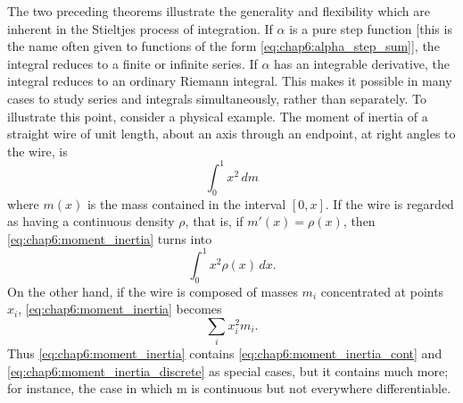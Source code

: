 \begin{remark} %
  \label{rem:chap6:stieltjes_generality}
  The two preceding theorems illustrate the generality and
  flexibility which are inherent in the Stieltjes process of
  integration. If $\alpha$ is a pure step function [this is the name
    often given to functions of the form
  \eqref{eq:chap6:alpha_step_sum}], the integral reduces to a finite
  or infinite series. If $\alpha$ has an integrable derivative, the
  integral reduces to an ordinary Riemann integral. This makes it
  possible in many cases to study series and integrals
  simultaneously, rather than separately.
  To illustrate this point, consider a physical example. The moment
  of inertia of a straight wire of unit length, about an axis through
  an endpoint, at right angles to the wire, is
  \begin{equation} \label{eq:chap6:moment_inertia}
    \int_0^1 x^2 \, dm
  \end{equation}
  where $m(x)$ is the mass contained in the interval $[0, x]$. If the
  wire is regarded as having a continuous density $\rho$, that is, if
  $m'(x) = \rho(x)$, then \eqref{eq:chap6:moment_inertia} turns into
  \begin{equation} \label{eq:chap6:moment_inertia_cont}
    \int_0^1 x^2 \rho(x) \, dx.
  \end{equation}
  On the other hand, if the wire is composed of masses $m_i$
  concentrated at points $x_i$, \eqref{eq:chap6:moment_inertia} becomes
  \begin{equation} \label{eq:chap6:moment_inertia_discrete}
    \sum_i x_i^2 m_i.
  \end{equation}
  Thus \eqref{eq:chap6:moment_inertia} contains
  \eqref{eq:chap6:moment_inertia_cont} and
  \eqref{eq:chap6:moment_inertia_discrete} as special cases, but it
  contains much more; for instance, the case in which m is continuous
  but not everywhere differentiable.
\end{remark}

